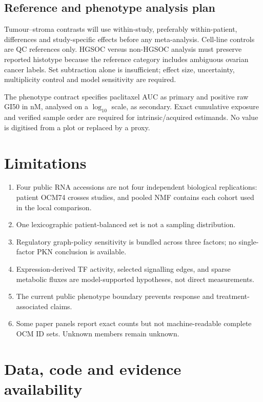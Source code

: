 \documentclass[10pt]{article}
\begin{document}
\subsection{Reference and phenotype analysis plan}

Tumour--stroma contrasts will use within-study, preferably within-patient,
differences and study-specific effects before any meta-analysis.  Cell-line
controls are QC references only.  HGSOC versus non-HGSOC analysis must preserve
reported histotype because the reference category includes ambiguous ovarian
cancer labels.  Set subtraction alone is insufficient; effect size,
uncertainty, multiplicity control and model sensitivity are required.

The phenotype contract specifies paclitaxel AUC as primary and positive raw
GI50 in nM, analysed on a $\log_{10}$ scale, as secondary.  Exact cumulative
exposure and verified sample order are required for intrinsic/acquired
estimands.  No value is digitised from a plot or replaced by a proxy.

\section{Limitations}

\begin{enumerate}[leftmargin=*]
  \item Four public RNA accessions are not four independent biological
  replications: patient OCM74 crosses studies, and pooled NMF contains each
  cohort used in the local comparison.
  \item One lexicographic patient-balanced set is not a sampling distribution.
  \item Regulatory graph-policy sensitivity is bundled across three factors;
  no single-factor PKN conclusion is available.
  \item Expression-derived TF activity, selected signalling edges, and sparse
  metabolic fluxes are model-supported hypotheses, not direct measurements.
  \item The current public phenotype boundary prevents response and treatment-
  associated claims.
  \item Some paper panels report exact counts but not machine-readable complete
  OCM ID sets.  Unknown members remain unknown.
\end{enumerate}

\section{Data, code and evidence availability}
\end{document}
